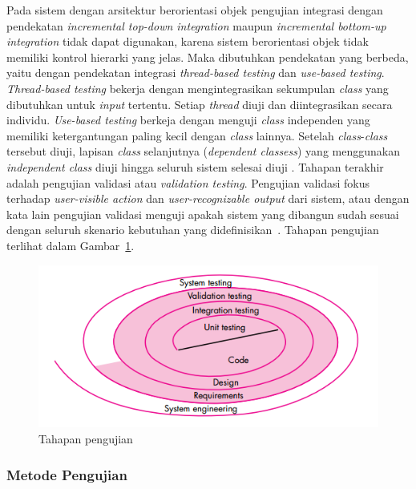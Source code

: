 Pada sistem dengan arsitektur berorientasi objek pengujian integrasi
dengan pendekatan \emph{incremental top-down integration} maupun
\emph{incremental bottom-up integration} tidak dapat digunakan,
karena sistem berorientasi objek tidak memiliki kontrol hierarki
yang jelas. Maka dibutuhkan pendekatan yang berbeda, yaitu dengan
pendekatan integrasi \emph{thread-based testing} dan \emph{use-based
  testing}. \emph{Thread-based testing} bekerja dengan
mengintegrasikan sekumpulan \emph{class} yang dibutuhkan untuk \emph{input}
tertentu. Setiap \emph{thread} diuji dan diintegrasikan secara
individu. \emph{Use-based testing} berkeja dengan menguji
\emph{class} independen yang memiliki ketergantungan paling kecil
dengan \emph{class} lainnya. Setelah \emph{class}-\emph{class}
tersebut diuji, lapisan \emph{class} selanjutnya (\emph{dependent
  classess}) yang menggunakan \emph{independent class} diuji hingga
seluruh sistem selesai diuji \parencite{presman2010software}. Tahapan terakhir adalah pengujian
validasi atau \emph{validation testing}. Pengujian validasi fokus
terhadap \emph{user-visible action} dan \emph{user-recognizable
  output} dari sistem, atau dengan kata lain pengujian validasi
menguji apakah sistem yang dibangun sudah sesuai dengan seluruh
skenario kebutuhan yang didefinisikan~\parencite{pressman2010software}. Tahapan pengujian
terlihat dalam Gambar~\ref{fig:testing-level}.

\begin{figure}[H]
  \centering
  \includegraphics[width=.7\linewidth]{img/tahapan-pengujian}
  \caption{Tahapan pengujian \parencite{presman2010software}}\label{fig:testing-level}
\end{figure}

\subsubsection{Metode Pengujian}

